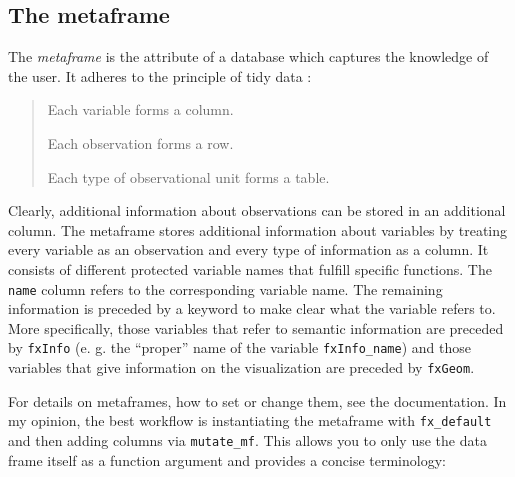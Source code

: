 \documentclass[]{report}
\newenvironment{Shaded}{\begin{snugshade}}{\end{snugshade}}
\newcommand{\KeywordTok}[1]{\textcolor[rgb]{0.13,0.29,0.53}{\textbf{#1}}}
\newcommand{\DataTypeTok}[1]{\textcolor[rgb]{0.13,0.29,0.53}{#1}}
\newcommand{\DecValTok}[1]{\textcolor[rgb]{0.00,0.00,0.81}{#1}}
\newcommand{\StringTok}[1]{\textcolor[rgb]{0.31,0.60,0.02}{#1}}
\newcommand{\OperatorTok}[1]{\textcolor[rgb]{0.81,0.36,0.00}{\textbf{#1}}}
\newcommand{\NormalTok}[1]{#1}
\theoremstyle{definition}
\theoremstyle{definition}
\theoremstyle{definition}
\theoremstyle{remark}
\begin{document}
\subsection{The metaframe}\label{the-metaframe}

The \emph{metaframe} is the attribute of a database which captures the
knowledge of the user. It adheres to the principle of tidy data
\citep{Wickham2014}:

\begin{quote}
Each variable forms a column.

Each observation forms a row.

Each type of observational unit forms a table.
\end{quote}

Clearly, additional information about observations can be stored in an
additional column. The metaframe stores additional information about
variables by treating every variable as an observation and every type of
information as a column. It consists of different protected variable
names that fulfill specific functions. The \texttt{name} column refers
to the corresponding variable name. The remaining information is
preceded by a keyword to make clear what the variable refers to. More
specifically, those variables that refer to semantic information are
preceded by \texttt{fxInfo} (e. g. the ``proper'' name of the variable
\texttt{fxInfo\_name}) and those variables that give information on the
visualization are preceded by \texttt{fxGeom}.

For details on metaframes, how to set or change them, see the
documentation. In my opinion, the best workflow is instantiating the
metaframe with \texttt{fx\_default} and then adding columns via
\texttt{mutate\_mf}. This allows you to only use the data frame itself
as a function argument and provides a concise terminology:

\begin{Shaded}
\end{Shaded}
\end{document}
